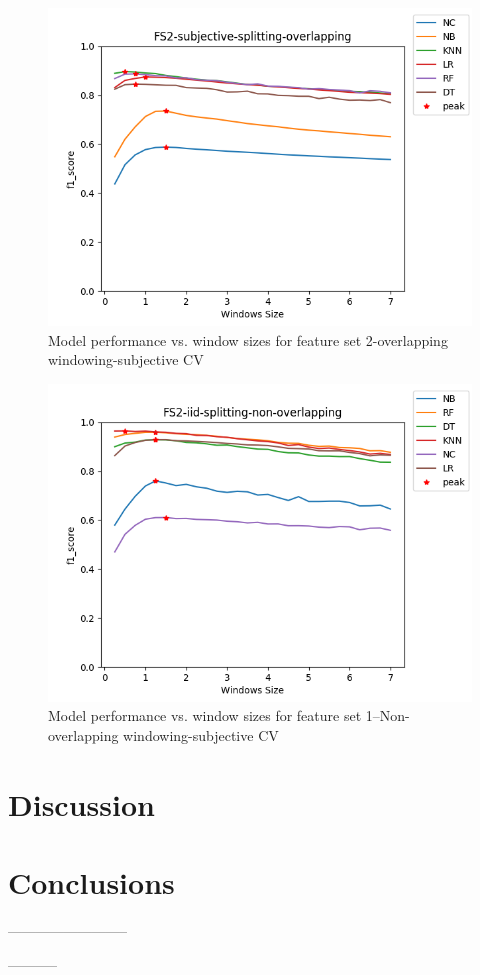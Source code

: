 \begin{figure}[h]
    \centering
    \includegraphics[width=.3\textwidth]{Figures/FS2-subjective-splitting-overlapping.png}
    \caption{Model performance vs. window sizes for feature set 2-overlapping windowing-subjective CV}
    \label{fig:sbj-nonover-fs2}
\end{figure}








\begin{figure}[h]
    \centering
    \includegraphics[width=.3\textwidth]{Figures/FS2-iid-splitting-non-overlapping.png}
    \caption{Model performance vs. window sizes for feature set 1--Non-overlapping windowing-subjective CV}
    \label{fig:sbj-nonover-fs1}
\end{figure}





\section{Discussion}



\section{Conclusions}
--------------------------




\begin{acks}

-----------
\end{acks}
